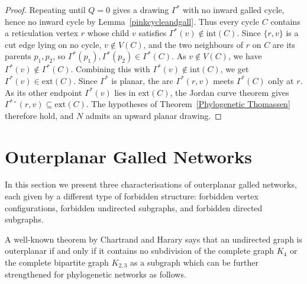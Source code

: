 \documentclass[pdflatex,sn-mathphys-num]{sn-jnl}
\theoremstyle{thmstyleone}%
\theoremstyle{thmstyletwo}%
\theoremstyle{thmstylethree}%
\begin{document}
\begin{proof}
Repeating until $Q=0$ gives a drawing $\Gamma^*$ with no inward galled cycle, hence no inward cycle by Lemma~\ref{pinkcycleandgall}. Thus every cycle $C$ contains a reticulation vertex $r$ whose child $v$ satisfies $\Gamma^*(v)\notin\mathrm{int}(C)$. Since $\{r,v\}$ is a cut edge lying on no cycle, $v\notin V(C)$, and the two neighbours of $r$ on $C$ are its parents $p_1,p_2$, so $\Gamma^*(p_1),\Gamma^*(p_2)\in\Gamma^*(C)$. As $v\notin V(C)$, we have $\Gamma^*(v)\notin\Gamma^*(C)$. Combining this with 
$\Gamma^*(v)\notin\mathrm{int}(C)$, we get $\Gamma^*(v)\in\mathrm{ext}(C)$.  Since $\Gamma^*$ is planar, the arc $\Gamma^*(r,v)$ meets $\Gamma^*(C)$ only 
at $r$. As its other endpoint $\Gamma^*(v)$ lies in $\mathrm{ext}(C)$, the Jordan curve theorem gives $\Gamma^{*\circ}(r,v)\subseteq\mathrm{ext}(C)$.
The hypotheses of Theorem~\ref{Phylogenetic Thomassen} therefore hold, and $N$ admits an upward planar drawing.
\end{proof}





\section {Outerplanar Galled Networks} \label{sec:outer}

In this section we present three characterisations of outerplanar galled networks, each given by a different type of forbidden structure: forbidden vertex configurations, forbidden undirected subgraphs, and forbidden directed subgraphs.

A well-known theorem by 
Chartrand and Harary \cite{Chartrand-Harary} says  that an undirected graph is outerplanar if and only if it contains no subdivision of the complete graph $K_4$ or the complete bipartite graph $K_{2,3}$ as a subgraph which can be further strengthened 
for phylogenetic networks as follows.
\end{document}
